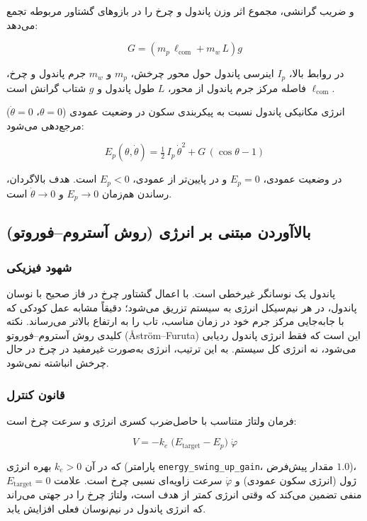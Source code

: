 و ضریب گرانشی، مجموع اثر وزن پاندول و چرخ را در بازوهای گشتاور مربوطه تجمع می‌دهد:

\begin{equation}
    G = \left(m_p \, \ell_{\text{com}} + m_w \, L\right) g
\end{equation}

در روابط بالا، $I_p$ اینرسی پاندول حول محور چرخش، $m_p$ و $m_w$ جرم پاندول و چرخ، $\ell_{\text{com}}$ فاصله مرکز جرم پاندول از محور، $L$ طول پاندول و $g$ شتاب گرانش است.

انرژی مکانیکی پاندول نسبت به پیکربندی سکون در وضعیت عمودی ($\theta = 0$، $\dot\theta = 0$) مرجع‌دهی می‌شود:

\begin{equation}
    E_p(\theta, \dot\theta) = \tfrac{1}{2}\, I_p\, \dot\theta^2 + G\,(\cos\theta - 1)
\end{equation}

در وضعیت عمودی، $E_p = 0$ و در پایین‌تر از عمودی، $E_p < 0$ است. هدف بالاگردان، رساندن هم‌زمان $E_p \to 0$ و $\dot\theta \to 0$ است.

\subsection{بالاآوردن مبتنی بر انرژی (روش آستروم–فوروتو)}

\subsubsection{شهود فیزیکی}

پاندول یک نوسانگر غیرخطی است. با اعمال گشتاور چرخ در فاز صحیح با نوسان پاندول، در هر نیم‌سیکل انرژی به سیستم تزریق می‌شود؛ دقیقاً مشابه عمل کودکی که با جابه‌جایی مرکز جرم خود در زمان مناسب، تاب را به ارتفاع بالاتر می‌رساند. نکته کلیدی روش آستروم–فوروتو (Åström–Furuta) این است که فقط انرژی پاندول ردیابی می‌شود، نه انرژی کل سیستم. به این ترتیب، انرژی به‌صورت غیرمفید در چرخ در حال چرخش انباشته نمی‌شود.

\subsubsection{قانون کنترل}

فرمان ولتاژ متناسب با حاصل‌ضرب کسری انرژی و سرعت چرخ است:

\begin{equation}
    V = -k_e \;\bigl(E_{\text{target}} - E_p\bigr)\; \dot\varphi
\end{equation}

که در آن $k_e > 0$ بهره انرژی (پارامتر \texttt{energy\_swing\_up\_gain}، مقدار پیش‌فرض $1.0$)، $E_{\text{target}} = 0$ ژول (انرژی سکون عمودی) و $\dot\varphi$ سرعت زاویه‌ای نسبی چرخ است. علامت منفی تضمین می‌کند که وقتی انرژی کمتر از هدف است، ولتاژ چرخ را در جهتی می‌راند که انرژی پاندول در نیم‌نوسان فعلی افزایش یابد.

